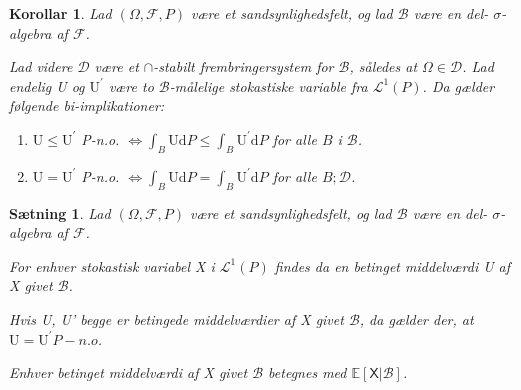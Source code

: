 \documentclass{article}
\newcommand{\1}{\mathbbm{1}}
\newcommand{\X}{\mathsf{X}}
\theoremstyle{boxed}
\newtheorem{corollary}[theorem]{Korollar}
\newtheorem{proposition}[theorem]{Sætning}
\begin{document}
\begin{theorem-box}
    \begin{corollary}
        Lad $(\Omega, \mathcal{F}, P)$ være et sandsynlighedsfelt, og lad $\mathcal{B}$ være en del- $\sigma$-algebra af $\mathcal{F}$.

Lad videre $\mathcal{D}$ være et $\cap$-stabilt frembringersystem for $\mathcal{B}$, således at $\Omega \in \mathcal{D}$.
Lad endelig U og $\mathrm{U}^{\prime}$ være to $\mathcal{B}$-målelige stokastiske variable fra $\mathcal{L}^1(P)$.
Da gælder følgende bi-implikationer:
\begin{enumerate}
    \item[\textnormal{(i)}] $\mathrm{U} \leq \mathrm{U}^{\prime}$ P-n.o. $\Longleftrightarrow \int_B \mathrm{U} \mathrm{d} P \leq \int_B \mathrm{U}^{\prime} \mathrm{d} P$ for alle $B$ i $\mathcal{B}$.
    \item[\textnormal{(ii)}] $\mathrm{U}=\mathrm{U}^{\prime}$ P-n.o. $\Longleftrightarrow \int_B \mathrm{U} \mathrm{d} P=\int_B \mathrm{U}^{\prime} \mathrm{d} P$ for alle $B ; \mathcal{D}$.
\end{enumerate}
    \end{corollary}
\end{theorem-box}
\begin{theorem-box}
    \begin{proposition}
        Lad $(\Omega, \mathcal{F}, P)$ være et sandsynlighedsfelt, og lad $\mathcal{B}$ være en del- $\sigma$-algebra af $\mathcal{F}$.

For enhver stokastisk variabel X i $\mathcal{L}^1(P)$ findes da en betinget middelværdi U af X givet $\mathcal{B}$.

Hvis U, U' begge er betingede middelværdier af X givet $\mathcal{B}$, da gælder der, at $\mathrm{U}=\mathrm{U}^{\prime} P-n . o$.

Enhver betinget middelværdi af X givet $\mathcal{B}$ betegnes med $\mathbb{E}[\X| \mathcal{B}]$.
    \end{proposition}
\end{theorem-box}
\end{document}
